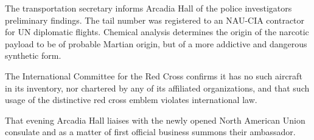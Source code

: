 The transportation secretary informs Arcadia Hall of the police investigators preliminary findings. The tail number was registered to an NAU-CIA contractor for UN diplomatic flights. Chemical analysis determines the origin of the narcotic payload to be of probable Martian origin, but of a more addictive and dangerous synthetic form.

The International Committee for the Red Cross confirms it has no such aircraft in its inventory, nor chartered by any of its affiliated organizations, and that such usage of the distinctive red cross emblem violates international law.

That evening Arcadia Hall liaises with the newly opened North American Union consulate and as a matter of first official business summons their ambassador.
\StopTimelineDate

